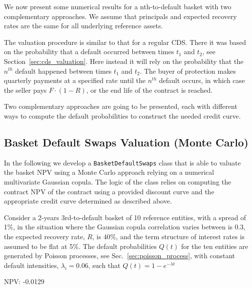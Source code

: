 We now present some numerical results for a nth-to-default basket with two complementary approaches. We assume that principals and expected recovery rates are the same for all underlying reference assets. 

The valuation procedure is similar to that for a regular CDS. There it was based on the probability that a default occurred between times $t_1$ and $t_2$, see Section~\ref{sec:cds_valuation}. Here instead it will rely on the probability that the $n^{th}$ default happened between times $t_1$ and $t_2$. The buyer of protection makes quarterly payments at a specified rate until the $n^{th}$ default occurs, in which case the seller pays $F\cdot(1-R)$, or the end life of the contract is reached. 

Two complementary approaches are going to be presented, each with different ways to compute the default probabilities to construct the needed credit curve.

\subsection{Basket Default Swaps Valuation (Monte Carlo)}
\label{basket-cds-valuation-with-monte-carlo}

\begin{finmarkets}
	In the following we develop a \texttt{BasketDefaultSwaps} class that is able to valuate the basket NPV using a Monte Carlo approach relying on a numerical multivariate Gaussian copula. 
	The logic of the class relies on computing the contract NPV of the contract using a provided discount curve and the appropriate credit curve determined as described above.
\end{finmarkets}


Consider a 2-years 3rd-to-default basket of 10 reference entities, with a spread of 1\%, in the situation where the Gaussian copula correlation varies between is 0.3, the expected recovery rate, $R$, is $40\%$, and the term structure of interest rates is assumed to be flat at 5\%. The default probabilities $Q(t)$ for the ten entities are generated by Poisson processes, see Sec.~\ref{sec:poisson_process}, with constant default intensities, $\lambda_i=0.06$, such that $Q(t) = 1 - e^{-\lambda t}$

\begin{ioutput}
NPV: -0.0129
\end{ioutput}

